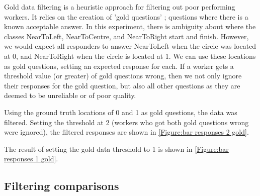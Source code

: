 
Gold data filtering is a heuristic approach for filtering out poor performing workers.
 It relies on the creation of 'gold questions' ; questions where there is a known acceptable answer. 
 In this experiment, there is ambiguity about where the classes NearToLeft, NearToCentre, and NearToRight start and finish.
  However, we would expect all responders to answer NearToLeft when the circle was located at 0, and NearToRight when the circle is located at 1. 
  We can use these locations as gold questions, setting an expected response for each. 
  If a worker gets a threshold value (or greater) of gold questions wrong, then we not only ignore their responses for the gold question, but also all other questions as they are deemed to be unreliable or of poor quality. 

Using the ground truth locations of 0 and 1 as gold questions, the data was filtered. 
Setting the threshold at 2 (workers who got both gold questions wrong were ignored), the filtered responses are shown in \ref{Figure:bar responses 2 gold}. 

The result of setting the gold data threshold to 1 is shown in \ref{Figure:bar responses 1 gold}.


\subsection{Filtering comparisons}

